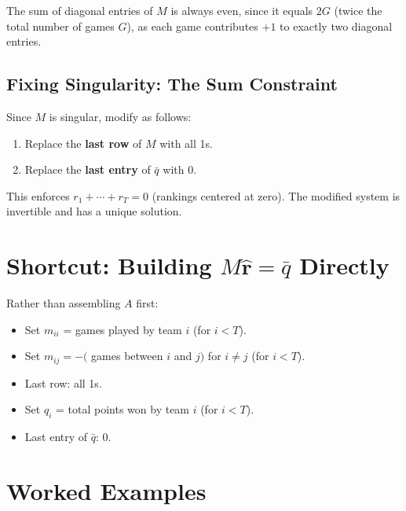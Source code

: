 \begin{fact}
The sum of diagonal entries of $M$ is always even, since it equals $2G$ (twice the total number of games $G$), as each game contributes $+1$ to exactly two diagonal entries.
\end{fact}

\subsection*{Fixing Singularity: The Sum Constraint}

Since $M$ is singular, modify as follows:
\begin{enumerate}
  \item Replace the \textbf{last row} of $M$ with all 1s.
  \item Replace the \textbf{last entry} of $\bar{q}$ with 0.
\end{enumerate}
This enforces $r_1+\cdots+r_T=0$ (rankings centered at zero). The modified system is invertible and has a unique solution.

\section{Shortcut: Building $M\hat{\mathbf{r}}=\bar{q}$ Directly}

Rather than assembling $A$ first:
\begin{itemize}
  \item Set $m_{ii}$ = games played by team $i$ (for $i<T$).
  \item Set $m_{ij} = -($ games between $i$ and $j)$ for $i\neq j$ (for $i<T$).
  \item Last row: all 1s.
  \item Set $q_i$ = total points won by team $i$ (for $i<T$).
  \item Last entry of $\bar{q}$: 0.
\end{itemize}

\section{Worked Examples}

